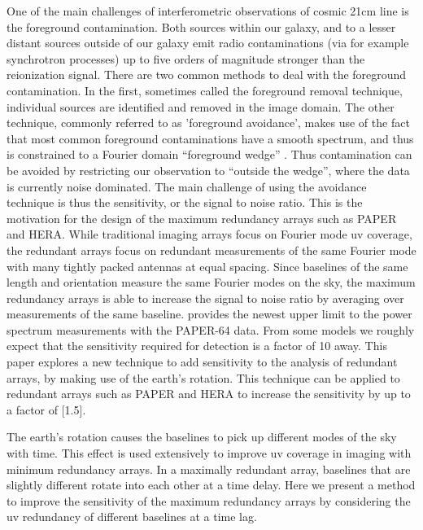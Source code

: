 \documentclass[preprint2,numberedappendix,tighten,twocolappendix]{aastex6}  %
\renewcommand\[{\begin{equation}}
\renewcommand\]{\end{equation}}
\begin{document}
One of the main challenges of interferometric observations of cosmic
21cm line is the foreground contamination. Both sources within our
galaxy, and to a lesser distant sources outside of our galaxy emit
radio contaminations (via for example synchrotron processes) up to five orders of magnitude stronger than the
reionization signal. There are two common methods to deal with the
foreground contamination. In the first, sometimes called the foreground
removal technique, individual sources are identified and removed in the image domain.
The other technique, commonly referred to as 'foreground avoidance',
makes use of the fact that most common foreground contaminations have a smooth
spectrum, and thus is constrained to a Fourier domain ``foreground
wedge'' \cite{wedge1,wedge2}. Thus contamination can be avoided
by restricting our observation to ``outside the wedge'', where the data is currently noise dominated. The main
challenge of using the avoidance technique is thus the sensitivity, or
the signal to noise ratio. This is the motivation for the design of
the maximum redundancy arrays such as PAPER and HERA. While traditional
imaging arrays focus on Fourier mode uv coverage, the redundant arrays
focus on redundant measurements of the same Fourier mode
with many tightly packed antennas at equal spacing. Since baselines
of the same length and orientation measure the same Fourier modes
on the sky, the maximum redundancy arrays is able to increase the
signal to noise ratio by averaging over measurements of the same baseline.
\cite{Ali2015} provides the newest upper limit to the power spectrum
measurements with the PAPER-64 data. From some models we roughly expect
that the sensitivity required for detection is a factor of 10 away.
This paper explores a new technique to add sensitivity to the analysis
of redundant arrays, by making use of the earth's rotation. This technique
can be applied to redundant arrays such as PAPER and HERA to increase
the sensitivity by up to a factor of [1.5]. 

The earth's rotation causes the baselines to pick up different modes of the sky with time. 
This effect is used extensively to improve uv coverage in imaging with minimum redundancy arrays. In
a maximally redundant array, baselines that are slightly different
rotate into each other at a time delay. Here we present a method to
improve the sensitivity of the maximum redundancy arrays by considering
the uv redundancy of different baselines at a time lag. 
\end{document}
